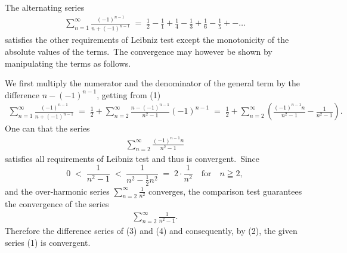 \documentclass[12pt]{article}
\theoremstyle{definition}
\begin{document}
The alternating series
\begin{align}
\sum_{n=1}^\infty\frac{(-1)^{n-1}}{n\!+\!(-1)^{n-1}} \;=\;
\frac{1}{2}-\frac{1}{1}+\frac{1}{4}-\frac{1}{3}+\frac{1}{6}-\frac{1}{5}+-\ldots
\end{align}
satisfies the other requirements of Leibniz test except the monotonicity of the absolute values of the terms.\, The convergence may however be shown by manipulating the terms as follows.

We first multiply the numerator and the denominator of the general term by the difference $n\!-\!(-1)^{n-1}$, getting from (1)
\begin{align}
\sum_{n=1}^\infty\frac{(-1)^{n-1}}{n\!+\!(-1)^{n-1}} 
\;=\; \frac{1}{2}+\sum_{n=2}^\infty\frac{n\!-\!(-1)^{n-1}}{n^2\!-\!1}(-1)^{n-1} 
\;=\; \frac{1}{2}+\sum_{n=2}^\infty\left(\frac{(-1)^{n-1}n}{n^2\!-\!1}-\frac{1}{n^2\!-\!1}\right).
\end{align}
One can  that the series
\begin{align}
\sum_{n=2}^\infty\frac{(-1)^{n-1}n}{n^2\!-\!1}
\end{align}
satisfies all requirements of Leibniz test and thus is convergent.\, Since 
$$
0 \;<\; \frac{1}{n^2\!-\!1} \;<\; \frac{1}{n^2\!-\!\frac{1}{2}n^2} \;=\; 2\cdot\frac{1}{n^2}\quad\mbox{for}\quad n \geqq 2,
$$
and the over-harmonic series $\sum_{n=2}^\infty\frac{1}{n^2}$ converges, the comparison test guarantees the convergence of the series
\begin{align}
\sum_{n=2}^\infty\frac{1}{n^2\!-\!1}.
\end{align}
Therefore the difference series of (3) and (4) and consequently, by (2), the given series (1) is convergent.


\end{document}
